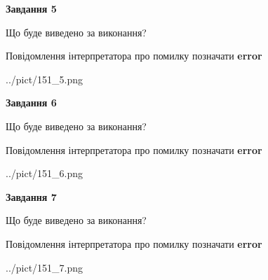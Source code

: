 \documentclass[10pt, ukrainian]{article}
\begin{document}
{\begin {large}
{\begin {center}\textbf{Завдання 5}\end {center}}\par
Що буде виведено за виконання? \par
Повідомлення інтерпретатора про помилку позначати \textbf{error}

\begin{center}
	{../pict/151_5.png}
\end{center}
\newpage

{\begin {center}\textbf{Завдання 6}\end {center}}\par
Що буде виведено за виконання? \par
Повідомлення інтерпретатора про помилку позначати \textbf{error}

\begin{center}
	{../pict/151_6.png}
\end{center}
\newpage

{\begin {center}\textbf{Завдання 7}\end {center}}\par
Що буде виведено за виконання? \par
Повідомлення інтерпретатора про помилку позначати \textbf{error}

\begin{center}
	{../pict/151_7.png}
\end{center}
\newpage

\end {large}}
\end{document}
